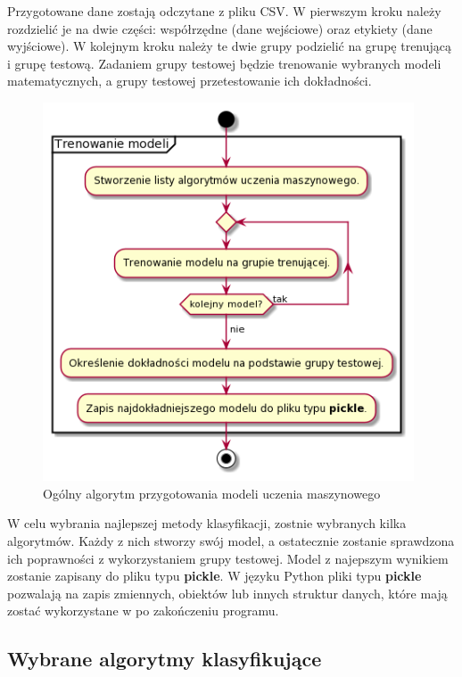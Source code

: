 \quad Przygotowane dane zostają odczytane z pliku CSV. W pierwszym kroku należy rozdzielić je na dwie części: współrzędne (dane wejściowe) oraz etykiety (dane wyjściowe). W kolejnym kroku należy te dwie grupy podzielić na grupę trenującą i grupę testową. Zadaniem grupy testowej będzie trenowanie wybranych modeli matematycznych, a grupy testowej przetestowanie ich dokładności. 

\begin{figure}[H]
    \begin{center}
        \includegraphics[width=11cm]{../images/train_models.png}
        \caption{Ogólny algorytm przygotowania modeli uczenia maszynowego}
    \end{center}
\end{figure}

\quad W celu wybrania najlepszej metody klasyfikacji, zostnie wybranych kilka algorytmów. Każdy z nich stworzy swój model, a ostatecznie zostanie sprawdzona ich poprawności z wykorzystaniem grupy testowej. Model z najepszym wynikiem zostanie zapisany do pliku typu \textbf{pickle}. W języku Python pliki typu \textbf{pickle} pozwalają na zapis zmiennych, obiektów lub innych struktur danych, które mają zostać wykorzystane w po zakończeniu programu. 

\subsection{Wybrane algorytmy klasyfikujące}

